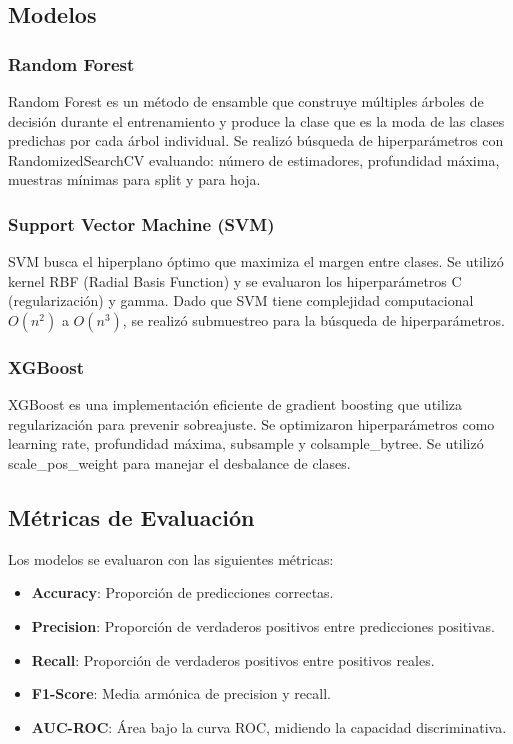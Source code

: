 \documentclass[conference]{IEEEtran}
\begin{document}
\subsection{Modelos}

\subsubsection{Random Forest}
Random Forest \cite{breiman2001} es un método de ensamble que construye múltiples árboles de decisión durante el entrenamiento y produce la clase que es la moda de las clases predichas por cada árbol individual. Se realizó búsqueda de hiperparámetros con RandomizedSearchCV evaluando: número de estimadores, profundidad máxima, muestras mínimas para split y para hoja.

\subsubsection{Support Vector Machine (SVM)}
SVM \cite{cortes1995} busca el hiperplano óptimo que maximiza el margen entre clases. Se utilizó kernel RBF (Radial Basis Function) y se evaluaron los hiperparámetros C (regularización) y gamma. Dado que SVM tiene complejidad computacional $O(n^2)$ a $O(n^3)$, se realizó submuestreo para la búsqueda de hiperparámetros.

\subsubsection{XGBoost}
XGBoost \cite{chen2016} es una implementación eficiente de gradient boosting que utiliza regularización para prevenir sobreajuste. Se optimizaron hiperparámetros como learning rate, profundidad máxima, subsample y colsample\_bytree. Se utilizó scale\_pos\_weight para manejar el desbalance de clases.

\subsection{Métricas de Evaluación}

Los modelos se evaluaron con las siguientes métricas:

\begin{itemize}
    \item \textbf{Accuracy}: Proporción de predicciones correctas.
    \item \textbf{Precision}: Proporción de verdaderos positivos entre predicciones positivas.
    \item \textbf{Recall}: Proporción de verdaderos positivos entre positivos reales.
    \item \textbf{F1-Score}: Media armónica de precision y recall.
    \item \textbf{AUC-ROC}: Área bajo la curva ROC, midiendo la capacidad discriminativa.
\end{itemize}
\end{document}
